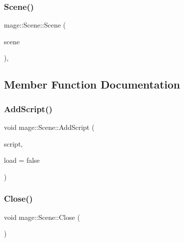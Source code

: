 \subsubsection{\texorpdfstring{Scene()}{Scene()}\hspace{0.1cm}{\footnotesize\ttfamily [3/3]}}
{\footnotesize\ttfamily mage\+::\+Scene\+::\+Scene (\begin{DoxyParamCaption}\item[{\hyperlink{classmage_1_1_scene}{Scene} \&\&}]{scene }\end{DoxyParamCaption})\hspace{0.3cm}{\ttfamily [private]}, {\ttfamily [delete]}}



\subsection{Member Function Documentation}
\hypertarget{classmage_1_1_scene_aa98dbf063994948dd2e434c7f0f6ee06}{}\label{classmage_1_1_scene_aa98dbf063994948dd2e434c7f0f6ee06} 
\subsubsection{\texorpdfstring{Add\+Script()}{AddScript()}}
{\footnotesize\ttfamily void mage\+::\+Scene\+::\+Add\+Script (\begin{DoxyParamCaption}\item[{\hyperlink{namespacemage_a1e01ae66713838a7a67d30e44c67703e}{Shared\+Ptr}$<$ \hyperlink{classmage_1_1_behavior_script}{Behavior\+Script} $>$}]{script,  }\item[{bool}]{load = {\ttfamily false} }\end{DoxyParamCaption})}

\hypertarget{classmage_1_1_scene_afcdedaac5ecab7dcbbb180426054aaa5}{}\label{classmage_1_1_scene_afcdedaac5ecab7dcbbb180426054aaa5} 
\subsubsection{\texorpdfstring{Close()}{Close()}}
{\footnotesize\ttfamily void mage\+::\+Scene\+::\+Close (\begin{DoxyParamCaption}{ }\end{DoxyParamCaption})\hspace{0.3cm}{\ttfamily [virtual]}}


